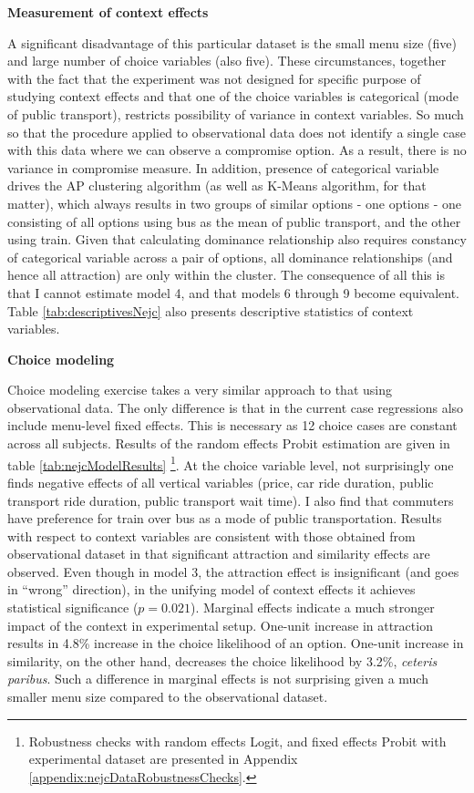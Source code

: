 \documentclass[a4paper,12pt]{article}
\begin{document}
\textbf{Measurement of context effects}

A significant disadvantage of this particular dataset is the small menu size (five) and large number of choice variables (also five). These circumstances, together with the fact that the experiment was not designed for specific purpose of studying context effects and that one of the choice variables is categorical (mode of public transport), restricts possibility of variance in context variables. So much so that the procedure applied to observational data does not identify a single case with this data where we can observe a compromise option. As a result, there is no variance in compromise measure. In addition, presence of categorical variable drives the AP clustering algorithm (as well as K-Means algorithm, for that matter), which always results in two groups of similar options - one options - one consisting of all options using bus as the mean of public transport, and the other using train. Given that calculating dominance relationship also requires constancy of categorical variable across a pair of options, all dominance relationships (and hence all attraction) are only within the cluster. The consequence of all this is that I cannot estimate model 4, and that models 6 through 9 become equivalent. Table \ref{tab:descriptivesNejc} also presents descriptive statistics of context variables.

\textbf{Choice modeling}

Choice modeling exercise takes a very similar approach to that using observational data. The only difference is that in the current case regressions also include menu-level fixed effects. This is necessary as 12 choice cases are constant across all subjects. Results of the random effects Probit estimation are given in table \ref{tab:nejcModelResults} \footnote{Robustness checks with random effects Logit, and fixed effects Probit with experimental dataset are presented in Appendix \ref{appendix:nejcDataRobustnessChecks}.}.  At the choice variable level, not surprisingly one finds negative effects of all vertical variables (price, car ride duration, public transport ride duration, public transport wait time). I also find that commuters have preference for train over bus as a mode of public transportation.
Results with respect to context variables are consistent with those obtained from observational dataset in that significant attraction and similarity effects are observed. Even though in model 3, the attraction effect is insignificant (and goes in ``wrong'' direction), in the unifying model of context effects it achieves statistical significance ($p = 0.021$). Marginal effects indicate a much stronger impact of the context in experimental setup. One-unit increase in attraction results in 4.8\% increase in the choice likelihood of an option. One-unit increase in similarity, on the other hand, decreases the choice likelihood by 3.2\%, \textit{ceteris paribus}. Such a difference in marginal effects is not surprising given a much smaller menu size compared to the observational dataset.
\end{document}
